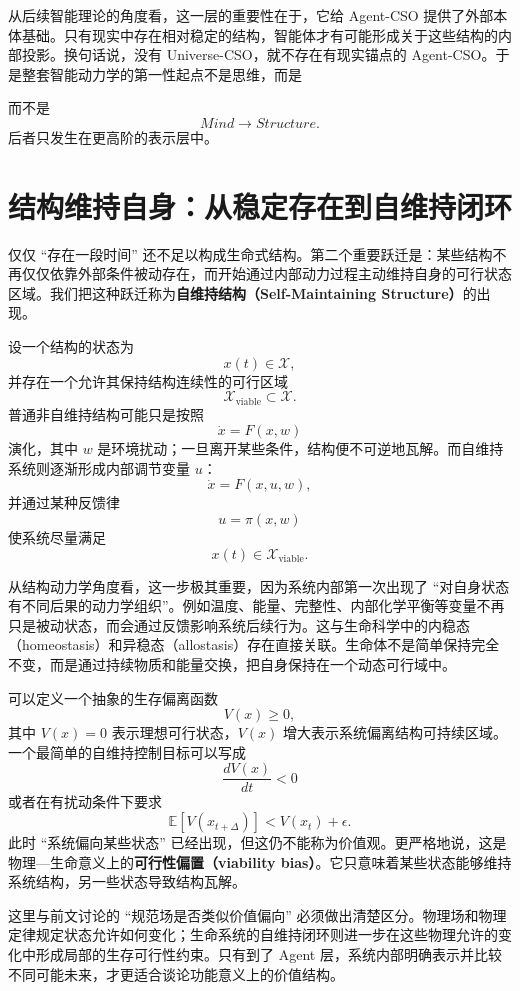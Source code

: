 从后续智能理论的角度看，这一层的重要性在于，它给 Agent-CSO 提供了外部本体基础。只有现实中存在相对稳定的结构，智能体才有可能形成关于这些结构的内部投影。换句话说，没有 Universe-CSO，就不存在有现实锚点的 Agent-CSO。于是整套智能动力学的第一性起点不是思维，而是
\begin{statementbox}
\centering
{}
\end{statementbox}
而不是
\[
Mind
\rightarrow
Structure.
\]
后者只发生在更高阶的表示层中。

\section{结构维持自身：从稳定存在到自维持闭环}

仅仅 ``存在一段时间'' 还不足以构成生命式结构。第二个重要跃迁是：某些结构不再仅仅依靠外部条件被动存在，而开始通过内部动力过程主动维持自身的可行状态区域。我们把这种跃迁称为\textbf{自维持结构（Self-Maintaining Structure）}的出现。

设一个结构的状态为
\[
x(t)\in\mathcal X,
\]
并存在一个允许其保持结构连续性的可行区域
\[
\mathcal X_{\mathrm{viable}}\subset\mathcal X.
\]
普通非自维持结构可能只是按照
\[
\dot x=F(x,w)
\]
演化，其中 $w$ 是环境扰动；一旦离开某些条件，结构便不可逆地瓦解。而自维持系统则逐渐形成内部调节变量 $u$：
\[
\dot x
=
F(x,u,w),
\]
并通过某种反馈律
\[
u=\pi(x,w)
\]
使系统尽量满足
\[
x(t)\in \mathcal X_{\mathrm{viable}}.
\]

从结构动力学角度看，这一步极其重要，因为系统内部第一次出现了 ``对自身状态有不同后果的动力学组织''。例如温度、能量、完整性、内部化学平衡等变量不再只是被动状态，而会通过反馈影响系统后续行为。这与生命科学中的内稳态（homeostasis）和异稳态（allostasis）存在直接关联。生命体不是简单保持完全不变，而是通过持续物质和能量交换，把自身保持在一个动态可行域中。

可以定义一个抽象的生存偏离函数
\[
V(x)\geq 0,
\]
其中 $V(x)=0$ 表示理想可行状态，$V(x)$ 增大表示系统偏离结构可持续区域。一个最简单的自维持控制目标可以写成
\[
\frac{dV(x)}{dt}<0
\]
或者在有扰动条件下要求
\[
\mathbb E[V(x_{t+\Delta})]
<
V(x_t)+\epsilon.
\]
此时 ``系统偏向某些状态'' 已经出现，但这仍不能称为价值观。更严格地说，这是物理—生命意义上的\textbf{可行性偏置（viability bias）}。它只意味着某些状态能够维持系统结构，另一些状态导致结构瓦解。

这里与前文讨论的 ``规范场是否类似价值偏向'' 必须做出清楚区分。物理场和物理定律规定状态允许如何变化；生命系统的自维持闭环则进一步在这些物理允许的变化中形成局部的生存可行性约束。只有到了 Agent 层，系统内部明确表示并比较不同可能未来，才更适合谈论功能意义上的价值结构。

